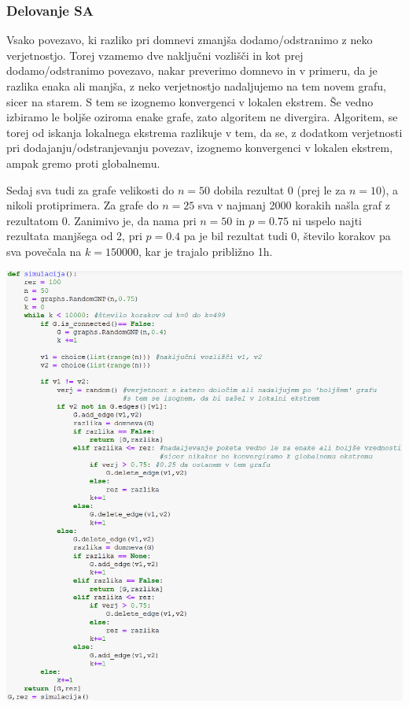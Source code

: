 \documentclass[10pt, a4paper]{article}
\begin{document}
\subsubsection{Delovanje SA}
Vsako povezavo, ki razliko pri domnevi zmanjša dodamo/odstranimo z neko verjetnostjo. Torej vzamemo dve naključni vozlišči in kot prej dodamo/odstranimo povezavo, nakar preverimo domnevo in v primeru, da je razlika enaka ali manjša, z neko verjetnostjo nadaljujemo na tem novem grafu, sicer na starem. S tem se izognemo konvergenci v lokalen ekstrem. Še vedno izbiramo le boljše oziroma enake grafe, zato algoritem ne divergira. Algoritem, se torej od iskanja lokalnega ekstrema razlikuje v tem, da se, z dodatkom verjetnosti pri dodajanju/odstranjevanju povezav, izognemo konvergenci v lokalen ekstrem, ampak gremo proti globalnemu. 

Sedaj sva tudi za grafe velikosti do $n=50$ dobila rezultat 0 (prej le za $n=10$), a nikoli protiprimera. Za grafe do $n=25$ sva v najmanj 2000 korakih našla graf z rezultatom 0. Zanimivo je, da nama pri $n=50$ in $p=0.75$ ni uspelo najti rezultata manjšega od 2, pri $p=0.4$ pa je bil rezultat tudi 0, število korakov pa sva povečala na $k=150000$, kar je trajalo približno 1h.

\includegraphics[scale=0.6]{Simulacija} 
\end{document}
